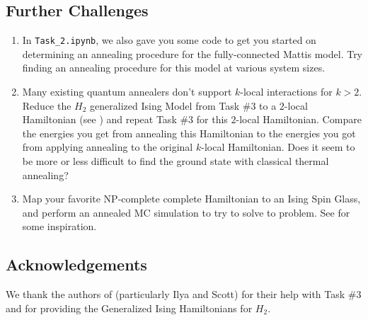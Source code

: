 \documentclass[12pt]{article}
\begin{document}
\subsection*{Further Challenges} \label{sec:challenges}

\begin{enumerate}
    \item In \texttt{Task\_2.ipynb}, we also gave you some code to get you started on determining
          an annealing procedure for the fully-connected Mattis model. Try finding an annealing
          procedure for this model at various system sizes.

    \item Many existing quantum annealers don't support $k$-local interactions for $k > 2$.
          Reduce the $H_2$ generalized Ising Model from Task \#3 to a $2$-local Hamiltonian
          (see \cite{xia2017electronic}) and repeat Task \#3 for this $2$-local Hamiltonian.
          Compare the energies you get from annealing this Hamiltonian to the energies
          you got from applying annealing to the original $k$-local Hamiltonian. Does it seem to
          be more or less difficult to find the ground state with classical thermal annealing?

    \item Map your favorite NP-complete complete Hamiltonian to an Ising Spin Glass, and perform
          an annealed MC simulation to try to solve to problem. See \cite{ising_np} for some
          inspiration.
\end{enumerate}

\subsection*{Acknowledgements}\label{sec:acknowledgements}
We thank the authors of \cite{iqcc} (particularly Ilya and Scott) for their help with Task \#3 and for
providing the Generalized Ising Hamiltonians for $H_2$.

\newpage

\nocite{*}


\end{document}
